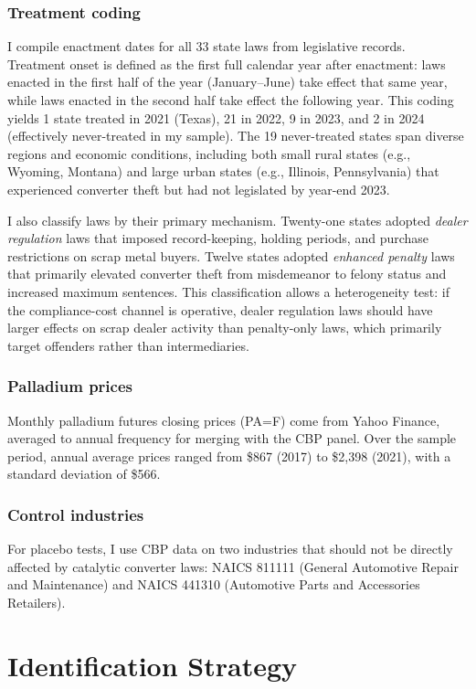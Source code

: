 \documentclass[12pt]{article}
\begin{document}
\subsubsection*{Treatment coding} I compile enactment dates for all 33 state laws from legislative records. Treatment onset is defined as the first full calendar year after enactment: laws enacted in the first half of the year (January--June) take effect that same year, while laws enacted in the second half take effect the following year. This coding yields 1 state treated in 2021 (Texas), 21 in 2022, 9 in 2023, and 2 in 2024 (effectively never-treated in my sample). The 19 never-treated states span diverse regions and economic conditions, including both small rural states (e.g., Wyoming, Montana) and large urban states (e.g., Illinois, Pennsylvania) that experienced converter theft but had not legislated by year-end 2023.

I also classify laws by their primary mechanism. Twenty-one states adopted \textit{dealer regulation} laws that imposed record-keeping, holding periods, and purchase restrictions on scrap metal buyers. Twelve states adopted \textit{enhanced penalty} laws that primarily elevated converter theft from misdemeanor to felony status and increased maximum sentences. This classification allows a heterogeneity test: if the compliance-cost channel is operative, dealer regulation laws should have larger effects on scrap dealer activity than penalty-only laws, which primarily target offenders rather than intermediaries.

\subsubsection*{Palladium prices} Monthly palladium futures closing prices (PA=F) come from Yahoo Finance, averaged to annual frequency for merging with the CBP panel. Over the sample period, annual average prices ranged from \$867 (2017) to \$2,398 (2021), with a standard deviation of \$566.

\subsubsection*{Control industries} For placebo tests, I use CBP data on two industries that should not be directly affected by catalytic converter laws: NAICS 811111 (General Automotive Repair and Maintenance) and NAICS 441310 (Automotive Parts and Accessories Retailers).


\section{Identification Strategy}\label{sec:strategy}
\end{document}
